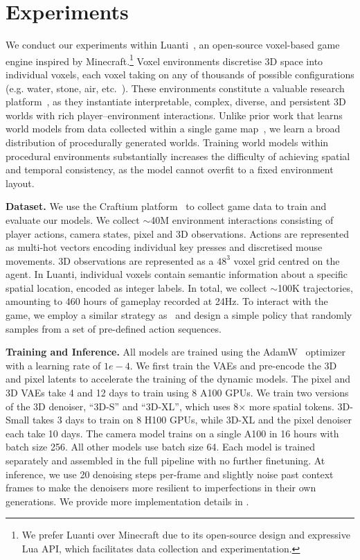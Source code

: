\documentclass{article}
\theoremstyle{plain}
\theoremstyle{definition}
\theoremstyle{remark}
\begin{document}
\section{Experiments}


We conduct our experiments within Luanti~\citep{luanti2024}, an open-source voxel-based game engine inspired by Minecraft.\footnote{We prefer Luanti over Minecraft due to its open-source design and expressive Lua API, which facilitates data collection and experimentation.} Voxel environments discretise 3D space into individual voxels, each voxel taking on any of thousands of possible configurations (e.g. water, stone, air, etc.\ ). These environments constitute a valuable research platform~\citep{malagon2025craftium,fan2022minedojo,guss2019minerl,baker2022video}, as they instantiate interpretable, complex, diverse, and persistent 3D worlds with rich player–environment interactions. Unlike prior work that learns world models from data collected within a single game map~\citep{alonso2024diffusion,kanervisto2025world}, we learn a broad distribution of procedurally generated worlds. Training world models within procedural environments substantially increases the difficulty of achieving spatial and temporal consistency, as the model cannot overfit to a fixed environment layout.


\textbf{Dataset.} We use the Craftium platform~\citep{malagon2025craftium} to collect game data to train and evaluate our models. We collect $\sim$40M environment interactions consisting of player actions, camera states, pixel and 3D observations. Actions are represented as multi-hot vectors encoding individual key presses and discretised mouse movements. 3D observations are represented as a $48^3$ voxel grid centred on the agent. In Luanti, individual voxels contain semantic information about a specific spatial location, encoded as integer labels. In total, we collect $\sim$100K trajectories, amounting to 460 hours of gameplay recorded at 24Hz. 
To interact with the game, we employ a similar strategy as~\citep{yu2025gamefactory} and design a simple policy that randomly samples from a set of pre-defined action sequences. %

\textbf{Training and Inference.} All models are trained using the AdamW~\citep{loshchilov2018decoupled} optimizer with a learning rate of $1e-4$. We first train the VAEs and pre-encode the 3D and pixel latents to accelerate the training of the dynamic models. The pixel and 3D VAEs take 4 and 12 days to train using 8 A100 GPUs. We train two versions of the 3D denoiser, ``3D-S'' and ``3D-XL'', which uses 8$\times$ more spatial tokens. 3D-Small takes 3 days to train on 8 H100 GPUs, while 3D-XL and the pixel denoiser each take 10 days. The camera model trains on a single A100 in 16 hours with batch size 256. All other models use batch size 64. Each model is trained separately and assembled in the full pipeline with no further finetuning. At inference, we use 20 denoising steps per-frame and slightly noise past context frames to make the denoisers more resilient to imperfections in their own generations. We provide more implementation details in .
\end{document}
